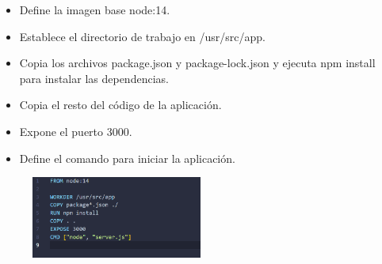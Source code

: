 \documentclass{article}
\begin{document}
\begin{itemize}
    \item Define la imagen base node:14.
    \item Establece el directorio de trabajo en /usr/src/app.
    \item Copia los archivos package.json y package-lock.json y ejecuta npm install para instalar las dependencias.
    \item Copia el resto del código de la aplicación.
    \item Expone el puerto 3000.
    \item Define el comando para iniciar la aplicación.
\end{itemize}

 \begin{figure}[H]
		          \centering
		          \includegraphics[width=0.5\textwidth,keepaspectratio]                       {img/dockerNode.png}
    \end{figure} 
\end{document}
